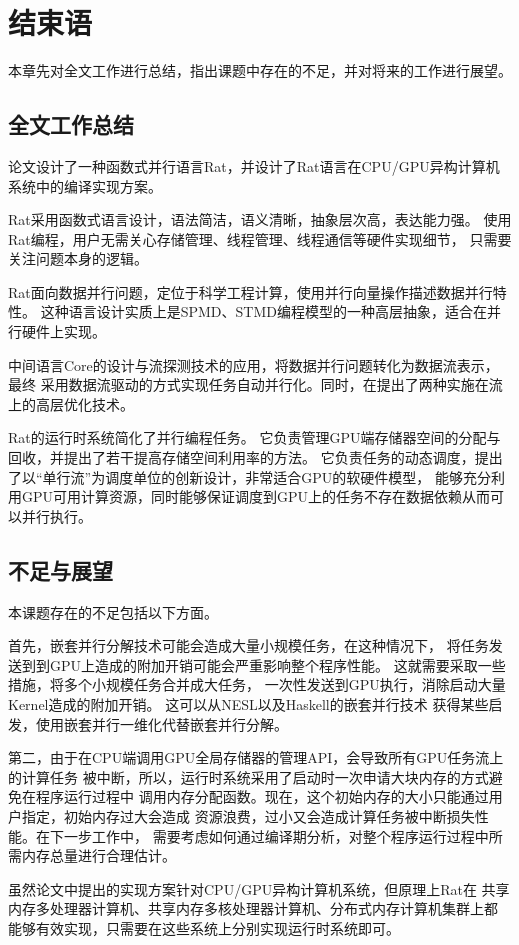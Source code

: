 \chapter{结束语}
本章先对全文工作进行总结，指出课题中存在的不足，并对将来的工作进行展望。

\section{全文工作总结}
论文设计了一种函数式并行语言Rat，并设计了Rat语言在CPU/GPU异构计算机系统中的编译实现方案。

Rat采用函数式语言设计，语法简洁，语义清晰，抽象层次高，表达能力强。
使用Rat编程，用户无需关心存储管理、线程管理、线程通信等硬件实现细节，
只需要关注问题本身的逻辑。

Rat面向数据并行问题，定位于科学工程计算，使用并行向量操作描述数据并行特性。
这种语言设计实质上是SPMD、STMD编程模型的一种高层抽象，适合在并行硬件上实现。

中间语言Core的设计与流探测技术的应用，将数据并行问题转化为数据流表示，最终
采用数据流驱动的方式实现任务自动并行化。同时，在提出了两种实施在流上的高层优化技术。

Rat的运行时系统简化了并行编程任务。
它负责管理GPU端存储器空间的分配与回收，并提出了若干提高存储空间利用率的方法。
它负责任务的动态调度，提出了以“单行流”为调度单位的创新设计，非常适合GPU的软硬件模型，
能够充分利用GPU可用计算资源，同时能够保证调度到GPU上的任务不存在数据依赖从而可以并行执行。

\section{不足与展望}
本课题存在的不足包括以下方面。

首先，嵌套并行分解技术可能会造成大量小规模任务，在这种情况下，
将任务发送到到GPU上造成的附加开销可能会严重影响整个程序性能。
这就需要采取一些措施，将多个小规模任务合并成大任务，
一次性发送到GPU执行，消除启动大量Kernel造成的附加开销。
这可以从NESL以及Haskell的嵌套并行技术
获得某些启发，使用嵌套并行一维化代替嵌套并行分解。

第二，由于在CPU端调用GPU全局存储器的管理API，会导致所有GPU任务流上的计算任务
被中断，所以，运行时系统采用了启动时一次申请大块内存的方式避免在程序运行过程中
调用内存分配函数。现在，这个初始内存的大小只能通过用户指定，初始内存过大会造成
资源浪费，过小又会造成计算任务被中断损失性能。在下一步工作中，
需要考虑如何通过编译期分析，对整个程序运行过程中所需内存总量进行合理估计。

虽然论文中提出的实现方案针对CPU/GPU异构计算机系统，但原理上Rat在
共享内存多处理器计算机、共享内存多核处理器计算机、分布式内存计算机集群上都
能够有效实现，只需要在这些系统上分别实现运行时系统即可。
